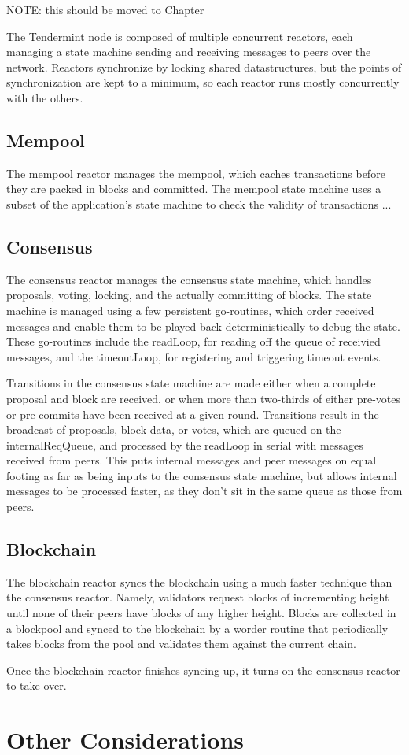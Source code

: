 NOTE: this should be moved to Chapter \cite{ch:networking}

The Tendermint node is composed of multiple concurrent reactors, 
each managing a state machine sending and receiving messages to peers over the network.
Reactors synchronize by locking shared datastructures, but the points of synchronization are kept to a minimum,
so each reactor runs mostly concurrently with the others.

\subsection{Mempool}

The mempool reactor manages the mempool, 
which caches transactions before they are packed in blocks and committed.
The mempool state machine uses a subset of the application's state machine to check the validity of transactions ...

\subsection{Consensus}

The consensus reactor manages the consensus state machine, which handles proposals, voting, locking, 
and the actually committing of blocks.
The state machine is managed using a few persistent go-routines, 
which order received messages and enable them to be played back deterministically to debug the state.
These go-routines include the readLoop, for reading off the queue of receivied messages, 
and the timeoutLoop, for registering and triggering timeout events. 

Transitions in the consensus state machine are made either when a complete proposal and block are received,
or when more than two-thirds of either pre-votes or pre-commits have been received at a given round.
Transitions result in the broadcast of proposals, block data, or votes, which are queued on the internalReqQueue,
and processed by the readLoop in serial with messages received from peers.
This puts internal messages and peer messages on equal footing as far as being inputs to the consensus state machine, 
but allows internal messages to be processed faster, as they don't sit in the same queue as those from peers.

\subsection{Blockchain}

The blockchain reactor syncs the blockchain using a much faster technique than the consensus reactor.
Namely, validators request blocks of incrementing height until none of their peers have blocks of any higher height.
Blocks are collected in a blockpool and synced to the blockchain by a worder routine that periodically takes blocks from the pool
and validates them against the current chain.

Once the blockchain reactor finishes syncing up, it turns on the consensus reactor to take over.

\section{Other Considerations}
